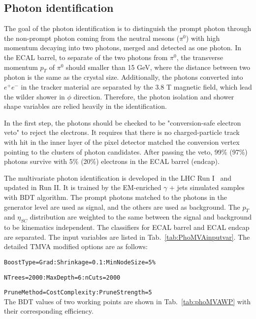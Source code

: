 \subsection{Photon identification}

The goal of the photon identification is to distinguish the prompt photon through the non-prompt photon coming from the neutral mesons ($\pi^{0}$) with high momentum decaying into two photons, merged and detected as one photon.
In the ECAL barrel, to separate of the two photons from $\pi^{0}$, the transverse momentum $p_{T}$ of $\pi^{0}$ should smaller than 15 GeV, where the distance between two photon is the same as the crystal size.
Additionally, the photons converted into $e^{+}e^{-}$ in the tracker material are separated by the 3.8 T magnetic field, which lead the wilder shower in $\phi$ direction.
Therefore, the photon isolation and shower shape variables are relied heavily in the identification.

In the first step, the photons should be checked to be "conversion-safe electron veto" to reject the electrons.
It requires that there is no charged-particle track with hit in the inner layer of the pixel detector matched the conversion vertex pointing to the clusters of photon candidates.
After passing the veto, 99\% (97\%) photons survive with 5\% (20\%) electrons in the ECAL barrel (endcap). %

The multivariate photon identification is developed in the LHC Run I~\cite{1502.02702} and updated in Run II.
It is trained by the EM-enriched $\gamma$ + jets simulated samples with BDT algorithm.
The prompt photons matched to the photons in the generator level are used as signal, and the others are used as background.
The $p_{T}$ and $\eta_{SC}$ distribution are weighted to the same between the signal and background to be kinematics independent.
The classifiers for ECAL barrel and ECAL endcap are separated.
The input variables are listed in Tab.~\ref{tab:PhoMVAinputvar}.
The detailed TMVA modified options are as follows:

\verb|BoostType=Grad:Shrinkage=0.1:MinNodeSize=5%|

\verb|NTrees=2000:MaxDepth=6:nCuts=2000|

\verb|PruneMethod=CostComplexity:PruneStrength=5|\\

The BDT values of two working points are shown in Tab.~\ref{tab:phoMVAWP} with their corresponding efficiency.


